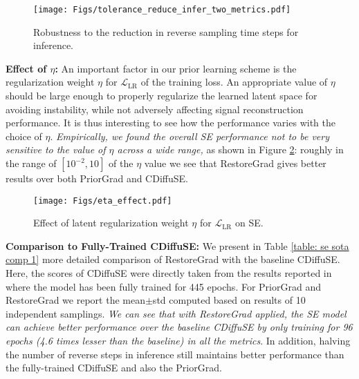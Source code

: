 \begin{figure}[!t]
    \centering
    \texttt{[image: Figs/tolerance\_reduce\_infer\_two\_metrics.pdf]}
    \vspace{-0.85cm}
    \caption{Robustness to the reduction in reverse sampling time steps for inference.} 
\label{fig: tolerance to reduced interence sampling steps}
\vspace{-0.41cm}
\end{figure}

\noindent\textbf{Effect of $\eta$:} 
An important factor in our prior learning scheme is the regularization weight $\eta$ for $\mathcal{L}_{\text{LR}}$ of the training loss. An appropriate value of $\eta$ should be large enough to properly regularize the learned latent space for avoiding instability, while not adversely affecting signal reconstruction performance. It is thus interesting to see how the performance varies with the choice of $\eta$. \textit{Empirically, we found the overall SE performance not to be very sensitive to the value of $\eta$ across a wide range,} as shown in Figure \ref{fig: eta effect}: roughly in the range of $[10^{-2}, 10]$ of the $\eta$ value we see that RestoreGrad gives better results over both PriorGrad and CDiffuSE.

\begin{figure}[!t]
    \centering
    \texttt{[image: Figs/eta\_effect.pdf]}
    \vspace{-0.3cm}
    \caption{Effect of latent regularization weight $\eta$ for $\mathcal{L}_{\text{LR}}$ on SE. } 
\label{fig: eta effect}
\vspace{-0.4cm}
\end{figure}

\noindent\textbf{Comparison to Fully-Trained CDiffuSE:} 
We present in Table \ref{table: se sota comp 1} more detailed comparison of RestoreGrad with the baseline CDiffuSE. Here, the scores of CDiffuSE were directly taken from the results reported in \citet{lu2022conditional} where the model has been fully trained for 445 epochs. For PriorGrad and RestoreGrad we report the mean$\pm$std computed based on results of 10 independent samplings. \textit{We can see that with RestoreGrad applied, the SE model can achieve better performance over the baseline CDiffuSE by only training for 96 epochs (4.6 times lesser than the baseline) in all the metrics}. In addition, halving the number of reverse steps in inference still maintains better performance than the fully-trained CDiffuSE and also the PriorGrad. 

